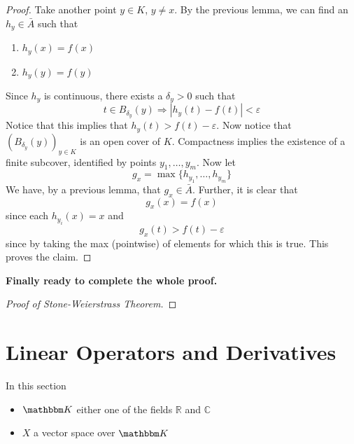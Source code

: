 \documentclass[11pt]{article}
\numberwithin{equation}{section}
\theoremstyle{definition}
\theoremstyle{definition}
\newcommand\parens[1]{\left( #1 \right)}
\def\imp{\Rightarrow}
\newcommand{\1}{\mathbbm 1}
\newcommand{\e}{\varepsilon}
\newcommand{\CC}{\mathbb C}
\newcommand{\RR}{\mathbb R}
\newcommand{\KK}{\mathbbm K}
\begin{document}
\begin{proof}
	Take another point $y \in K$, $y \neq x$. By the previous lemma, we can find an $h_y \in \bar{A}$ such that
	\begin{enumerate}
		\item $h_y(x) = f(x)$ 
		\item $h_y(y) = f(y)$
	\end{enumerate}
	Since $h_y$ is continuous, there exists a $\delta_y > 0$ such that
	\begin{equation}
		t \in B_{\delta_y}(y) \imp |h_y(t) - f(t)| < \e
	\end{equation}
	Notice that this implies that $h_y(t) > f(t) - \e$. Now notice that $\parens{B_{\delta_y}(y)}_{y \in K}$ is an open cover of $K$. Compactness implies the existence of a finite subcover, identified by points $y_1, \ldots, y_m$. Now let
	\begin{equation}
		g_x = \max\{h_{y_1},\ldots,h_{y_m}\}
	\end{equation}
	We have, by a previous lemma, that $g_x \in \bar{A}$. Further, it is clear that
	\begin{equation}
		g_x(x) = f(x) 
	\end{equation}
	since each $h_{y_i}(x) = x$ and
	\begin{equation}
		g_x(t) > f(t) - \e
	\end{equation}
	since by taking the max (pointwise) of elements for which this is true. This proves the claim. 
\end{proof}
	\textbf{Finally ready to complete the whole proof.}
\begin{proof}[Proof of Stone-Weierstrass Theorem]
	
\end{proof}













\newpage
\section{Linear Operators and Derivatives}

In this section
\begin{itemize}
	\item $\KK$ either one of the fields $\RR$ and $\CC$
	\item $X$ a vector space over $\KK$
\end{itemize}
\end{document}
